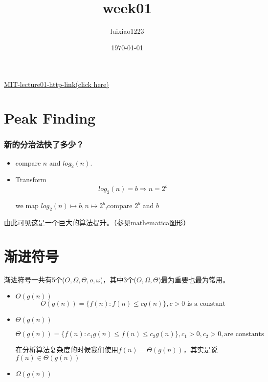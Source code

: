 \documentclass[11pt]{article}
\author{luixiao1223}
\date{\today}
\title{week01}
\begin{document}
\begin{CJK}{UTF8}{gbsn}
  
\href{https://ocw.mit.edu/courses/electrical-engineering-and-computer-science/6-006-introduction-to-algorithms-fall-2011/lecture-videos/MIT6\_006F11\_lec01.pdf}{MIT-lecture01-http-link(click here)}

\section{Peak Finding}
\subsubsection{新的分治法快了多少？}
\begin{itemize}
\item compare $n$ and $log_2(n)$.
\item Transform
  \begin{displaymath}
    log_2(n)=b \Rightarrow n=2^b
  \end{displaymath}

  we map $log_2(n)\mapsto b, n\mapsto 2^b$,compare $2^b$ and $b$
\end{itemize}

由此可见这是一个巨大的算法提升。（参见mathematica图形）

\section{渐进符号}

渐进符号一共有5个($O,\Omega,\Theta, o, \omega$)，其中3个($O,\Omega,\Theta$)最为重要也最为常用。

\begin{itemize}
\item $O(g(n))$
  \begin{displaymath}
    O(g(n))=\{f(n): f(n) \leqslant c g(n)\},c > 0\mbox{ is a constant}
  \end{displaymath}

\item $\Theta(g(n))$

  \begin{displaymath}
    \Theta(g(n))=\{f(n):c_1g(n)\leqslant f(n) \leqslant c_2 g(n)\},c_1>0,c_2>0,\mbox{are constants}
  \end{displaymath}

  在分析算法复杂度的时候我们使用$f(n)=\Theta(g(n))$，其实是说$f(n)\in \Theta(g(n))$

\item $\Omega(g(n))$


\end{itemize}
\end{CJK}
\end{document}
